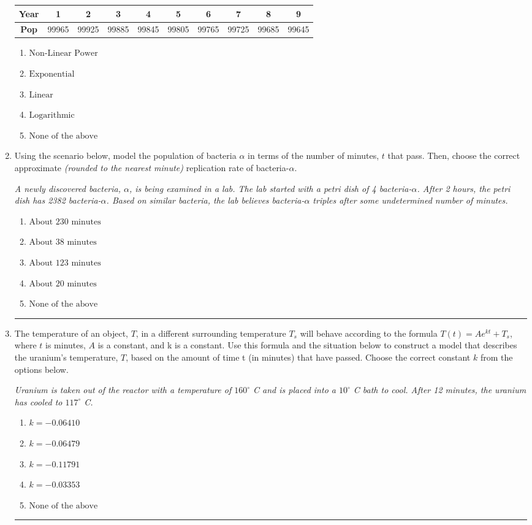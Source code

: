 \documentclass[14pt]{extbook}
\newcommand{\litem}[1]{\item#1\hspace*{-1cm}\rule{\textwidth}{0.4pt}}
\begin{document}
\begin{enumerate}
{\begin{tabular}{c|c|c|c|c|c|c|c|c|c}
\textbf{Year} &1 &2 &3 &4 &5 &6 &7 &8 &9\tabularnewline \hline
\textbf{Pop} &99965 &99925 &99885 &99845 &99805 &99765 &99725 &99685 &99645\end{tabular}\begin{enumerate}[label=\Alph*.]
\item \( \text{Non-Linear Power} \)
\item \( \text{Exponential} \)
\item \( \text{Linear} \)
\item \( \text{Logarithmic} \)
\item \( \text{None of the above} \)

\end{enumerate} }
\litem{
Using the scenario below, model the population of bacteria $\alpha$ in terms of the number of minutes, $t$ that pass. Then, choose the correct approximate \textit{(rounded to the nearest minute)} replication rate of bacteria-$\alpha$.
\begin{center}
    \textit{ A newly discovered bacteria, $\alpha$, is being examined in a lab. The lab started with a petri dish of 4 bacteria-$\alpha$. After 2 hours, the petri dish has 2382 bacteria-$\alpha$. Based on similar bacteria, the lab believes bacteria-$\alpha$ triples after some undetermined number of minutes. }
\end{center}
\begin{enumerate}[label=\Alph*.]
\item \( \text{About } 230 \text{ minutes} \)
\item \( \text{About } 38 \text{ minutes} \)
\item \( \text{About } 123 \text{ minutes} \)
\item \( \text{About } 20 \text{ minutes} \)
\item \( \text{None of the above} \)

\end{enumerate} }
\litem{
The temperature of an object, $T$, in a different surrounding temperature $T_s$ will behave according to the formula $T(t) = Ae^{kt} + T_s$, where $t$ is minutes, $A$ is a constant, and k is a constant. Use this formula and the situation below to construct a model that describes the uranium's temperature, $T$, based on the amount of time t (in minutes) that have passed. Choose the correct constant $k$ from the options below.
\begin{center}
    \textit{ Uranium is taken out of the reactor with a temperature of $160^{\circ}$ C and is placed into a $10^{\circ}$ C bath to cool. After 12 minutes, the uranium has cooled to $117^{\circ}$ C. }
\end{center}
\begin{enumerate}[label=\Alph*.]
\item \( k = -0.06410 \)
\item \( k = -0.06479 \)
\item \( k = -0.11791 \)
\item \( k = -0.03353 \)
\item \( \text{None of the above} \)


\end{enumerate}}
\end{enumerate}
\end{document}
